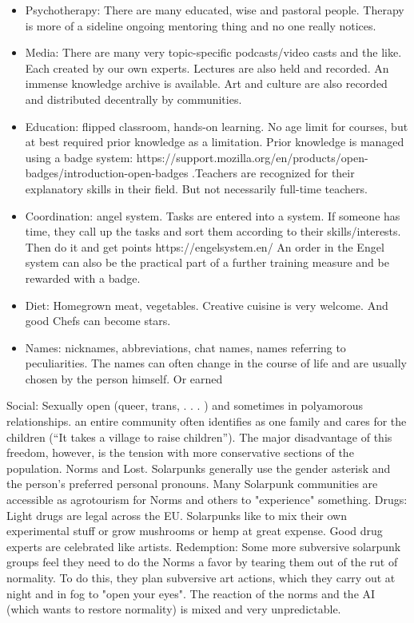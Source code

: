 \begin{itemize}
    \item Psychotherapy: There are many educated, wise and pastoral people. Therapy is more of a sideline ongoing mentoring thing and no one really notices.
    \item Media: There are many very topic-specific podcasts/video casts and the like. Each created by our own experts. Lectures are also held and recorded. An immense knowledge archive is available. Art and culture are also recorded and distributed decentrally by communities.
    \item Education: flipped classroom, hands-on learning. No age limit for courses, but at best required prior knowledge as a limitation. Prior knowledge is managed using a badge system: https://support.mozilla.org/en/products/open-badges/introduction-open-badges .Teachers are recognized for their explanatory skills in their field. But not necessarily full-time teachers.
    \item Coordination: angel system. Tasks are entered into a system. If someone has time, they call up the tasks and sort them according to their skills/interests. Then do it and get points https://engelsystem.en/ An order in the Engel system can also be the practical part of a further training measure and be rewarded with a badge.
    \item Diet: Homegrown meat, vegetables. Creative cuisine is very welcome. And good Chefs can become stars.
    \item Names: nicknames, abbreviations, chat names, names referring to peculiarities. The names can often change in the course of life and are usually chosen by the person himself. Or earned
\end{itemize}

Social: Sexually open (queer, trans, . . . ) and sometimes in polyamorous relationships. an entire community often identifies as one family and cares for the children (“It takes a village to raise children”).
The major disadvantage of this freedom, however, is the tension with more conservative sections of the population. Norms and Lost. Solarpunks generally use the gender asterisk and the person's preferred personal pronouns. Many Solarpunk communities are accessible as agrotourism for Norms and others to "experience" something.
Drugs: Light drugs are legal across the EU. Solarpunks like to mix their own experimental stuff or grow mushrooms or hemp at great expense. Good drug experts are celebrated like artists.
Redemption: Some more subversive solarpunk groups feel they need to do the Norms a favor by tearing them out of the rut of normality. To do this, they plan subversive art actions, which they carry out at night and in fog to "open your eyes". The reaction of the norms and the AI (which wants to restore normality) is mixed and very unpredictable.


